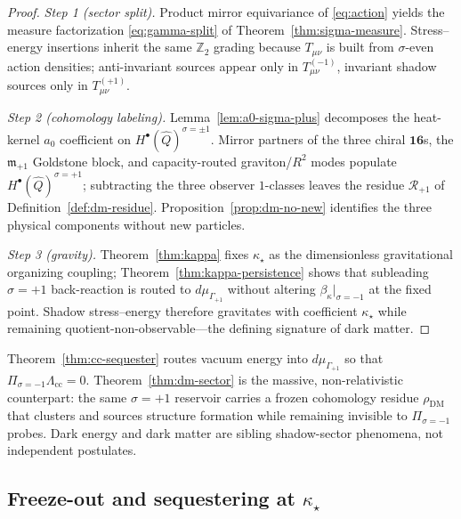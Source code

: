 \begin{proof}
\emph{Step 1 (sector split).}
Product mirror equivariance of \eqref{eq:action} yields the measure
factorization \eqref{eq:gamma-split} of Theorem~\ref{thm:sigma-measure}.
Stress--energy insertions inherit the same $\mathbb{Z}_2$ grading because
$T_{\mu\nu}$ is built from $\sigma$-even action densities; anti-invariant
sources appear only in $T_{\mu\nu}^{(-1)}$, invariant shadow sources only in
$T_{\mu\nu}^{(+1)}$.

\emph{Step 2 (cohomology labeling).}
Lemma~\ref{lem:a0-sigma-plus} decomposes the heat-kernel $a_0$ coefficient on
$H^\bullet(\hat Q)^{\sigma=\pm1}$. Mirror partners of the three chiral
$\mathbf{16}$s, the $\mathfrak{m}_{+1}$ Goldstone block, and
capacity-routed graviton/$R^2$ modes populate $H^\bullet(\hat Q)^{\sigma=+1}$;
subtracting the three observer $1$-classes leaves the residue
$\mathcal{R}_{+1}$ of Definition~\ref{def:dm-residue}. Proposition~\ref{prop:dm-no-new}
identifies the three physical components without new particles.

\emph{Step 3 (gravity).}
Theorem~\ref{thm:kappa} fixes $\kappa_\star$ as the dimensionless gravitational
organizing coupling; Theorem~\ref{thm:kappa-persistence} shows that
subleading $\sigma=+1$ back-reaction is routed to $d\mu_{\Gamma_{+1}}$ without
altering $\beta_\kappa|_{\sigma=-1}$ at the fixed point. Shadow stress--energy
therefore gravitates with coefficient $\kappa_\star$ while remaining
quotient-non-observable---the defining signature of dark matter.
\end{proof}

\begin{remark}
Theorem~\ref{thm:cc-sequester} routes vacuum energy into
$d\mu_{\Gamma_{+1}}$ so that $\Pi_{\sigma=-1}\Lambda_{\mathrm{cc}}=0$.
Theorem~\ref{thm:dm-sector} is the massive, non-relativistic counterpart:
the same $\sigma=+1$ reservoir carries a frozen cohomology residue
$\rho_{\mathrm{DM}}$ that clusters and sources structure formation while
remaining invisible to $\Pi_{\sigma=-1}$ probes. Dark energy and dark matter
are sibling shadow-sector phenomena, not independent postulates.
\end{remark}

\subsection{Freeze-out and sequestering at $\kappa_\star$}
\label{sec:dark-sector:abundance}

